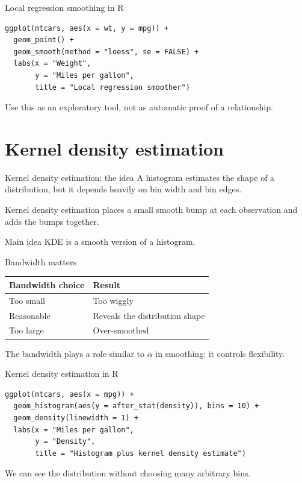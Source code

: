 \documentclass[aspectratio=169,11pt]{beamer}
\begin{document}
\begin{frame}[fragile]{Local regression smoothing in R}
\begin{lstlisting}
ggplot(mtcars, aes(x = wt, y = mpg)) +
  geom_point() +
  geom_smooth(method = "loess", se = FALSE) +
  labs(x = "Weight",
       y = "Miles per gallon",
       title = "Local regression smoother")
\end{lstlisting}

\vspace{0.3cm}
Use this as an exploratory tool, not as automatic proof of a relationship.
\end{frame}

\section{Kernel density estimation}

\begin{frame}{Kernel density estimation: the idea}
A histogram estimates the shape of a distribution, but it depends heavily on bin width and bin edges.

\vspace{0.3cm}
Kernel density estimation places a small smooth bump at each observation and adds the bumps together.

\vspace{0.4cm}
\begin{block}{Main idea}
KDE is a smooth version of a histogram.
\end{block}
\end{frame}

\begin{frame}{Bandwidth matters}
\begin{center}
\begin{tabular}{ll}
\toprule
Bandwidth choice & Result \\
\midrule
Too small & Too wiggly \\
Reasonable & Reveals the distribution shape \\
Too large & Over-smoothed \\
\bottomrule
\end{tabular}
\end{center}

\vspace{0.4cm}
The bandwidth plays a role similar to \(\alpha\) in smoothing: it controls flexibility.
\end{frame}

\begin{frame}[fragile]{Kernel density estimation in R}
\begin{lstlisting}
ggplot(mtcars, aes(x = mpg)) +
  geom_histogram(aes(y = after_stat(density)), bins = 10) +
  geom_density(linewidth = 1) +
  labs(x = "Miles per gallon",
       y = "Density",
       title = "Histogram plus kernel density estimate")
\end{lstlisting}

\vspace{0.3cm}
We can see the distribution without choosing many arbitrary bins.
\end{frame}
\end{document}
